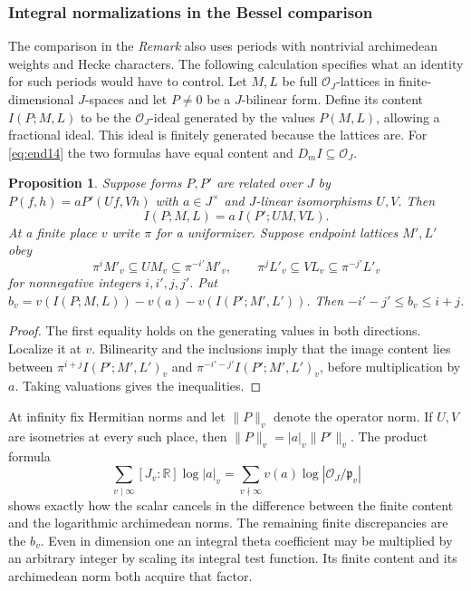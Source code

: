 \documentclass[a4paper,11pt]{article}
\newtheorem{proposition}{Proposition}[section]
\theoremstyle{definition}
\theoremstyle{remark}
\newcommand{\RR}{\mathbb R}\newcommand{\CC}{\mathbb C}\newcommand{\QQ}{\mathbb Q}
\numberwithin{equation}{section}
\begin{document}
\subsubsection{Integral normalizations in the Bessel comparison}\label{nav:II-07}
The comparison in the \emph{Remark} also uses periods with nontrivial archimedean weights and Hecke characters. The following calculation specifies what an identity for such periods would have to control. Let \(M,L\) be full \(\mathcal O_J\)-lattices in finite-dimensional \(J\)-spaces and let \(P\ne0\) be a \(J\)-bilinear form. Define its content \(I(P;M,L)\) to be the \(\mathcal O_J\)-ideal generated by the values \(P(M,L)\), allowing a fractional ideal. This ideal is finitely generated because the lattices are. For \eqref{eq:end14} the two formulas have equal content and \(D_m I\subseteq\mathcal O_J\).

\begin{proposition}\label{prop:content14}
Suppose forms \(P,P'\) are related over \(J\) by \(P(f,h)=aP'(Uf,Vh)\) with \(a\in J^\times\) and \(J\)-linear isomorphisms \(U,V\). Then
\[
 I(P;M,L)=a\,I(P';UM,VL).
\]
At a finite place \(v\) write \(\pi\) for a uniformizer. Suppose endpoint lattices \(M',L'\) obey
\[
 \pi^i M'_v\subseteq UM_v\subseteq\pi^{-i'}M'_v,\qquad
 \pi^j L'_v\subseteq VL_v\subseteq\pi^{-j'}L'_v
\]
for nonnegative integers \(i,i',j,j'\). Put \(b_v=v(I(P;M,L))-v(a)-v(I(P';M',L'))\). Then \(-i'-j'\le b_v\le i+j\).
\end{proposition}
\begin{proof}
The first equality holds on the generating values in both directions. Localize it at \(v\). Bilinearity and the inclusions imply that the image content lies between \(\pi^{i+j}I(P';M',L')_v\) and \(\pi^{-i'-j'}I(P';M',L')_v\), before multiplication by \(a\). Taking valuations gives the inequalities.
\end{proof}

At infinity fix Hermitian norms and let \(\|P\|_v\) denote the operator norm. If \(U,V\) are isometries at every such place, then \(\|P\|_v=|a|_v\|P'\|_v\). The product formula
\[
 \sum_{v\mid\infty}[J_v:\RR]\log|a|_v
       =\sum_{v\nmid\infty}v(a)\log|\mathcal O_J/\mathfrak p_v|
\]
shows exactly how the scalar cancels in the difference between the finite content and the logarithmic archimedean norms. The remaining finite discrepancies are the \(b_v\). Even in dimension one an integral theta coefficient may be multiplied by an arbitrary integer by scaling its integral test function. Its finite content and its archimedean norm both acquire that factor.
\end{document}
